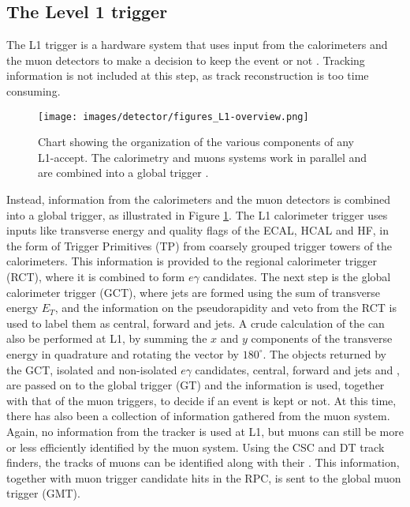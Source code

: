 \subsection*{The Level 1 trigger}
\noindent
\justify
The L1 trigger is a hardware system that uses input from the calorimeters and the muon detectors to make a decision to keep the event or not \cite{Khachatryan:2016bia}. 
Tracking information is not included at this step, as track reconstruction is too time consuming. 
\begin{figure}[!htp]
  \centering
   \texttt{[image: images/detector/figures\_L1-overview.png]}
   \caption{Chart showing the organization of the various components of any L1-accept. The calorimetry and muons systems work in parallel and are combined into a global trigger \cite{Khachatryan:2016bia}.}
   \label{fig:L1}
\end{figure}                                                                           
Instead, information from the calorimeters and the muon detectors is combined into a global trigger, as illustrated in Figure \ref{fig:L1}. 
The L1 calorimeter trigger uses inputs like transverse energy and quality flags of the ECAL, HCAL and HF, in the form of Trigger Primitives (TP) from coarsely grouped trigger towers of the calorimeters.
This information is provided to the regional calorimeter trigger (RCT), where it is combined to form $e\gamma$ candidates. 
The next step is the global calorimeter trigger (GCT), where jets are formed using the sum of transverse energy $E_{T}$, and the information on the pseudorapidity and \Tau veto from the RCT is used to label them as central, forward and \Tau jets. 
A crude calculation of the \ptmiss can also be performed at L1, by summing the $x$ and $y$ components of the transverse energy in quadrature and rotating the vector by $180^{\circ}$. 
The objects returned by the GCT, isolated and non-isolated $e\gamma$ candidates, central, forward and \Tau jets and \ptmiss, are passed on to the global trigger (GT) and the information is used, together with that of the muon triggers, to decide if an event is kept or not.   
At this time, there has also been a collection of information gathered from the muon system. 
Again, no information from the tracker is used at L1, but muons can still be more or less efficiently identified by the muon system. 
Using the CSC and DT track finders, the tracks of muons can be identified along with their \pt. 
This information, together with muon trigger candidate hits in the RPC, is sent to the global muon trigger (GMT). 
